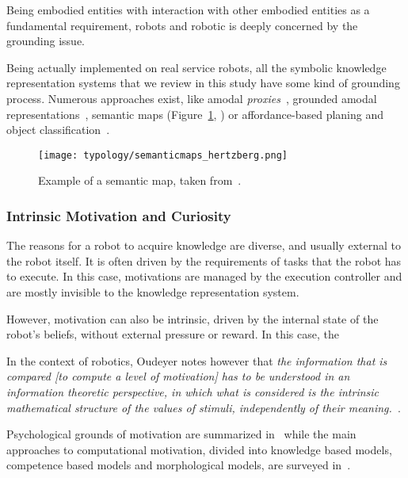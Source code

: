 Being embodied entities with interaction with other embodied entities as a
fundamental requirement, robots and robotic is deeply concerned by the
grounding issue.

Being actually implemented on real service robots, all the symbolic knowledge
representation systems that we review in this study have some kind of grounding
process. Numerous approaches exist, like amodal
\emph{proxies}~\cite{Jacobsson2008}, grounded amodal
representations~\cite{Alami2011, Mavridis2006}, semantic maps
(Figure~\ref{fig|semanticmap}, \cite{Nuechter2008, Galindo2008,Blodow2011}) or
affordance-based planing and object classification~\cite{Lorken2008,
Varadarajan2011}.


\begin{figure}
    \centering
    \texttt{[image: typology/semanticmaps\_hertzberg.png]}
    \caption{Example of a semantic map, taken from~\cite{Nuechter2008}.}
    \label{fig|semanticmap}
\end{figure}

\subsubsection{Intrinsic Motivation and Curiosity}

The reasons for a robot to acquire knowledge are diverse, and usually external
to the robot itself. It is often driven by the requirements of tasks that the
robot has to execute. In this case, motivations are managed by the execution
controller and are mostly invisible to the knowledge representation system.

However, motivation can also be intrinsic, driven by the internal state of the
robot's beliefs, without external pressure or reward. In this case, the 

In the context of robotics, Oudeyer notes however that \emph{the information that is
compared \emph{[to compute a level of motivation]} has to be understood in an
information theoretic perspective, in which what is considered is the intrinsic
mathematical structure of the values of stimuli, independently of their
meaning.}~\cite{Oudeyer2007}.

Psychological grounds of motivation are summarized in~\cite{Oudeyer2007} while
the main approaches to computational motivation, divided into knowledge based
models, competence based models and morphological models, are surveyed
in~\cite{Oudeyer2008}.

